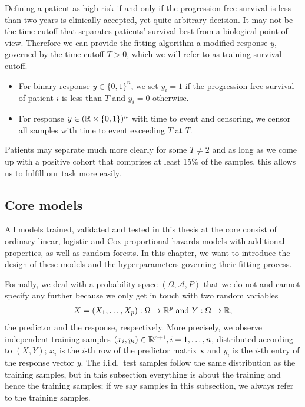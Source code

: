 Defining a patient as high-risk if and only if the progression-free survival is less than two years
is clinically accepted, yet quite arbitrary decision. It may not be the time cutoff that 
separates patients' survival 
best from a biological point of view. Therefore we can provide the fitting 
algorithm a modified response $y$, governed by the time cutoff $T > 0$, which we will refer to as 
training survival cutoff.
\begin{itemize}
    \item For binary response $y \in \{0, 1\}^n$, we set $y_i = 1$ if the progression-free survival 
        of patient $i$ is less than $T$ and $y_i = 0$ otherwise.
    \item For response $y \in (\mathbb{R} \times \{0, 1\})^n$ with time to event and censoring, we censor 
        all samples with time to event exceeding $T$ at $T$.
\end{itemize}
Patients may separate much more clearly for some $T \neq 2$ and as long as we come up 
with a positive cohort that comprises at least 15\% of the samples, this allows us to fulfill our 
task more easily.

\subsection{Core models}\label{subsec:core-models}

All models trained, validated and tested in this thesis at the core consist of ordinary linear, 
logistic and Cox proportional-hazards models with additional properties, as well as random forests.
In this chapter, we want to introduce the design of these models and the hyperparameters governing 
their fitting process.

Formally, we deal with a probability space $(\Omega, \mathcal{A}, P)$ that we do not and cannot 
specify any further because we only get in touch with two random variables 
\begin{align}
    X = (X_1, \ldots, X_p): \Omega \to \mathbb{R}^p \text{ and } Y: \Omega \to \mathbb{R},
\end{align}
the predictor and the response, respectively. More 
precisely, we observe independent training samples $(x_i, y_i) \in \mathbb{R}^{p+1}, i = 1, \ldots, n$, 
distributed according to $(X, Y)$; $x_i$ is the $i$-th row of the predictor matrix $\mathbf{x}$ and
$y_i$ is the $i$-th entry of the response vector $y$. The i.i.d.\ test samples follow the same 
distribution as the training samples, but in this subsection everything is about the training and 
hence the training samples; if we say samples in this subsection, we always refer to the training   
samples.

